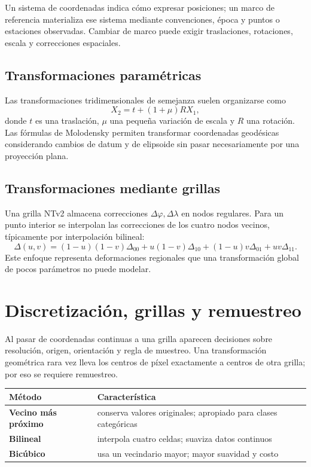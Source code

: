 Un sistema de coordenadas indica cómo expresar posiciones; un marco de referencia materializa
ese sistema mediante convenciones, época y puntos o estaciones observadas. Cambiar de marco
puede exigir traslaciones, rotaciones, escala y correcciones espaciales.

\subsection{Transformaciones paramétricas}

Las transformaciones tridimensionales de semejanza suelen organizarse como
\[
  X_2=t+(1+\mu)RX_1,
\]
donde \(t\) es una traslación, \(\mu\) una pequeña variación de escala y \(R\) una rotación.
Las fórmulas de Molodensky permiten transformar coordenadas geodésicas considerando cambios
de datum y de elipsoide sin pasar necesariamente por una proyección plana.

\subsection{Transformaciones mediante grillas}

Una grilla NTv2 almacena correcciones \(\Delta\varphi,\Delta\lambda\) en nodos regulares. Para
un punto interior se interpolan las correcciones de los cuatro nodos vecinos, típicamente por
interpolación bilineal:
\[
\Delta(u,v)=
(1-u)(1-v)\Delta_{00}
+u(1-v)\Delta_{10}
+(1-u)v\Delta_{01}
+uv\Delta_{11}.
\]
Este enfoque representa deformaciones regionales que una transformación global de pocos
parámetros no puede modelar.

\section{Discretización, grillas y remuestreo}

Al pasar de coordenadas continuas a una grilla aparecen decisiones sobre resolución,
origen, orientación y regla de muestreo. Una transformación geométrica rara vez lleva los
centros de píxel exactamente a centros de otra grilla; por eso se requiere remuestreo.

\begin{center}
\begin{tabularx}{.9\textwidth}{>{\bfseries}l X}
\toprule
Método & Característica\\
\midrule
Vecino más próximo & conserva valores originales; apropiado para clases categóricas\\
Bilineal & interpola cuatro celdas; suaviza datos continuos\\
Bicúbico & usa un vecindario mayor; mayor suavidad y costo\\
\bottomrule
\end{tabularx}
\end{center}


